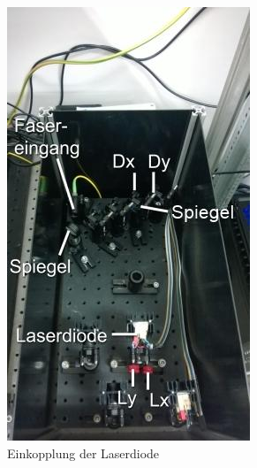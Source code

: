 \begin{figure}

\begin{minipage}[b]{0.4\linewidth}
\includegraphics[width=0.8\linewidth]{IMAGE/einkopplung.jpeg}
	\caption{Einkopplung der Laserdiode}
	\label{fig:einkopplung}
\end{minipage}


\end{figure}
